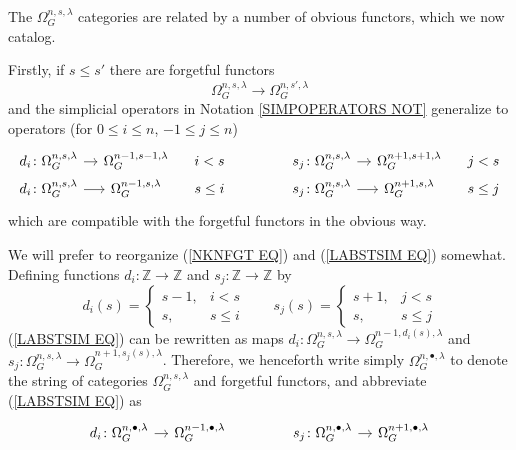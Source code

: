 \documentclass[a4paper,10pt]{article}%
\begin{document}
The $\Omega_G^{n,s,\lambda}$ categories are related by a number of obvious functors, which we now catalog.

Firstly, if $s \leq s'$ there are forgetful functors
\begin{equation}\label{NKNFGT EQ}
	\Omega_{G}^{n,s,\lambda} \to \Omega_{G}^{n,s',\lambda}
\end{equation}
and the simplicial operators
in Notation \ref{SIMPOPERATORS NOT}
generalize to operators (for $0 \leq i \leq n$, $-1\leq j \leq n$)
\begin{equation}\label{LABSTSIM EQ}
\begin{tikzcd}[row sep =0,column sep =1em]
	d_i \colon 
	\Omega_{G}^{n,s,\lambda} \ar{r} &
	\Omega_{G}^{n-1,s-1,\lambda} &
	i < s & & & &
	s_j \colon 
	\Omega_{G}^{n,s,\lambda} \ar{r} &
	\Omega_{G}^{n+1,s+1,\lambda} &
	j < s
\\
	d_i \colon 
	\Omega_{G}^{n,s,\lambda} \ar{r} &
	\Omega_{G}^{n-1,s,\lambda} &
	s \leq i & & & &
	s_j \colon 
	\Omega_{G}^{n,s,\lambda} \ar{r} &
	\Omega_{G}^{n+1,s,\lambda} &
	s \leq j
\end{tikzcd}
\end{equation}
which are compatible with the forgetful functors in the obvious way.

We will prefer to reorganize 
(\ref{NKNFGT EQ}) and (\ref{LABSTSIM EQ}) somewhat.
Defining functions 
$d_i \colon \mathbb{Z} \to \mathbb{Z}$
and 
$s_j \colon \mathbb{Z} \to \mathbb{Z}$
by
\begin{equation}\label{INTERMAPDEF EQ}
d_i(s) = 
	\begin{cases}
		s-1, & i<s
	\\
		s, & s \leq i
	\end{cases}
\qquad
s_j(s) = 
	\begin{cases}
		s+1, & j<s
	\\
		s, & s \leq j
	\end{cases}
\end{equation}
(\ref{LABSTSIM EQ}) can be rewritten as maps
$
	d_i \colon 
	\Omega_{G}^{n,s,\lambda} \to
	\Omega_{G}^{n-1,d_i(s),\lambda}
$
and 
$
	s_j \colon 
	\Omega_{G}^{n,s,\lambda} \to
	\Omega_{G}^{n+1,s_j(s),\lambda}
$.
Therefore, we henceforth write simply
$\Omega_G^{n,\bullet,\lambda}$ to denote the string of categories $\Omega_G^{n,s,\lambda}$
and forgetful functors, and abbreviate (\ref{LABSTSIM EQ}) as
\[
\begin{tikzcd}[row sep =0,column sep =1em]
	d_i \colon 
	\Omega_{G}^{n,\bullet,\lambda} \ar{r} &
	\Omega_{G}^{n-1,\bullet,\lambda} & & & &
	s_j \colon 
	\Omega_{G}^{n,\bullet,\lambda} \ar{r} &
	\Omega_{G}^{n+1,\bullet,\lambda}
\end{tikzcd}
\]
\end{document}
